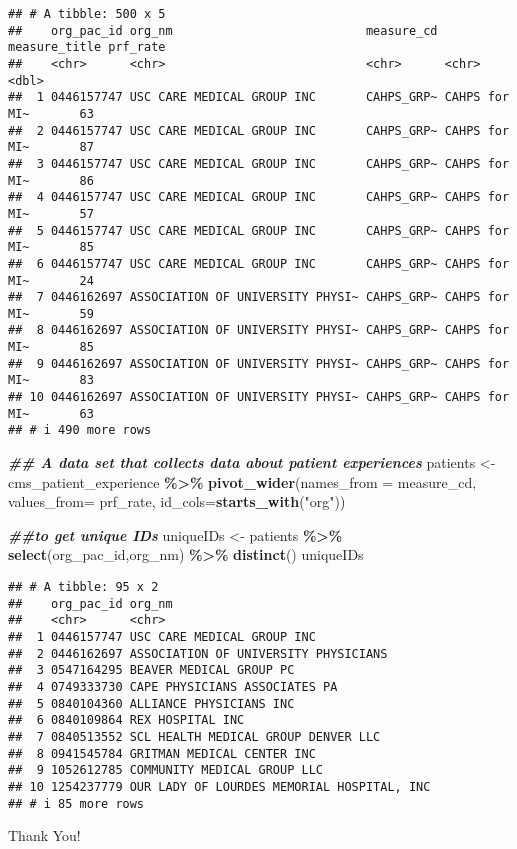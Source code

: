 \documentclass[
]{article}
\newenvironment{Shaded}{\begin{snugshade}}{\end{snugshade}}
\newcommand{\AttributeTok}[1]{\textcolor[rgb]{0.13,0.29,0.53}{#1}}
\newcommand{\DocumentationTok}[1]{\textcolor[rgb]{0.56,0.35,0.01}{\textbf{\textit{#1}}}}
\newcommand{\FunctionTok}[1]{\textcolor[rgb]{0.13,0.29,0.53}{\textbf{#1}}}
\newcommand{\NormalTok}[1]{#1}
\newcommand{\OtherTok}[1]{\textcolor[rgb]{0.56,0.35,0.01}{#1}}
\newcommand{\SpecialCharTok}[1]{\textcolor[rgb]{0.81,0.36,0.00}{\textbf{#1}}}
\newcommand{\StringTok}[1]{\textcolor[rgb]{0.31,0.60,0.02}{#1}}
\begin{document}
\begin{verbatim}
## # A tibble: 500 x 5
##    org_pac_id org_nm                           measure_cd measure_title prf_rate
##    <chr>      <chr>                            <chr>      <chr>            <dbl>
##  1 0446157747 USC CARE MEDICAL GROUP INC       CAHPS_GRP~ CAHPS for MI~       63
##  2 0446157747 USC CARE MEDICAL GROUP INC       CAHPS_GRP~ CAHPS for MI~       87
##  3 0446157747 USC CARE MEDICAL GROUP INC       CAHPS_GRP~ CAHPS for MI~       86
##  4 0446157747 USC CARE MEDICAL GROUP INC       CAHPS_GRP~ CAHPS for MI~       57
##  5 0446157747 USC CARE MEDICAL GROUP INC       CAHPS_GRP~ CAHPS for MI~       85
##  6 0446157747 USC CARE MEDICAL GROUP INC       CAHPS_GRP~ CAHPS for MI~       24
##  7 0446162697 ASSOCIATION OF UNIVERSITY PHYSI~ CAHPS_GRP~ CAHPS for MI~       59
##  8 0446162697 ASSOCIATION OF UNIVERSITY PHYSI~ CAHPS_GRP~ CAHPS for MI~       85
##  9 0446162697 ASSOCIATION OF UNIVERSITY PHYSI~ CAHPS_GRP~ CAHPS for MI~       83
## 10 0446162697 ASSOCIATION OF UNIVERSITY PHYSI~ CAHPS_GRP~ CAHPS for MI~       63
## # i 490 more rows
\end{verbatim}

\begin{Shaded}
\begin{Highlighting}[]
\DocumentationTok{\#\# A data set that collects data about patient experiences }
\NormalTok{patients }\OtherTok{\textless{}{-}}\NormalTok{ cms\_patient\_experience }\SpecialCharTok{\%\textgreater{}\%}
  \FunctionTok{pivot\_wider}\NormalTok{(}\AttributeTok{names\_from =}\NormalTok{ measure\_cd, }
              \AttributeTok{values\_from=}\NormalTok{ prf\_rate,}
              \AttributeTok{id\_cols=}\FunctionTok{starts\_with}\NormalTok{(}\StringTok{"org"}\NormalTok{))}

\DocumentationTok{\#\#to get unique IDs}
\NormalTok{uniqueIDs }\OtherTok{\textless{}{-}}\NormalTok{ patients }\SpecialCharTok{\%\textgreater{}\%} 
  \FunctionTok{select}\NormalTok{(org\_pac\_id,org\_nm) }\SpecialCharTok{\%\textgreater{}\%} 
  \FunctionTok{distinct}\NormalTok{()}
\NormalTok{uniqueIDs}
\end{Highlighting}
\end{Shaded}

\begin{verbatim}
## # A tibble: 95 x 2
##    org_pac_id org_nm                                    
##    <chr>      <chr>                                     
##  1 0446157747 USC CARE MEDICAL GROUP INC                
##  2 0446162697 ASSOCIATION OF UNIVERSITY PHYSICIANS      
##  3 0547164295 BEAVER MEDICAL GROUP PC                   
##  4 0749333730 CAPE PHYSICIANS ASSOCIATES PA             
##  5 0840104360 ALLIANCE PHYSICIANS INC                   
##  6 0840109864 REX HOSPITAL INC                          
##  7 0840513552 SCL HEALTH MEDICAL GROUP DENVER LLC       
##  8 0941545784 GRITMAN MEDICAL CENTER INC                
##  9 1052612785 COMMUNITY MEDICAL GROUP LLC               
## 10 1254237779 OUR LADY OF LOURDES MEMORIAL HOSPITAL, INC
## # i 85 more rows
\end{verbatim}

Thank You!
\end{document}
